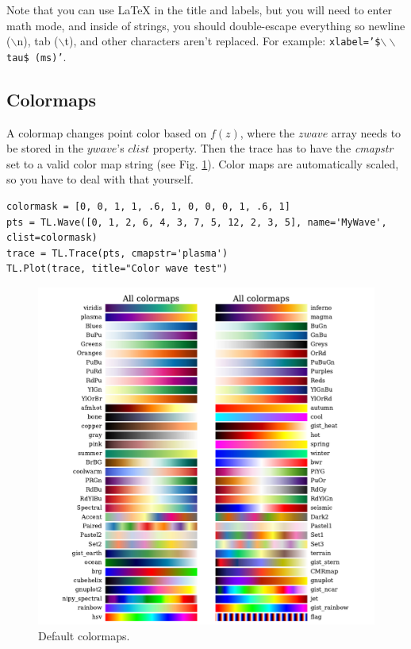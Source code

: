\documentclass[10pt]{report}
\begin{document}
Note that you can use LaTeX in the title and labels, but you will need to enter math mode, and inside of strings, you should double-escape everything so newline ($\backslash$n), tab ($\backslash$t), and other characters aren't replaced. For example: \texttt{xlabel='\$$\backslash\backslash$tau\$ (ms)'}.

\subsection{Colormaps}
A colormap changes point color based on $f(z)$, where the $zwave$ array needs to be stored in the $ywave$'s $clist$ property. Then the trace has to have the \textit{cmapstr} set to a valid color map string (see Fig. \ref{fig:colormaps}). Color maps are automatically scaled, so you have to deal with that yourself.
\begin{lstlisting}[caption=Error Bars on Trace After Creation]
colormask = [0, 0, 1, 1, .6, 1, 0, 0, 0, 1, .6, 1]
pts = TL.Wave([0, 1, 2, 6, 4, 3, 7, 5, 12, 2, 3, 5], name='MyWave', clist=colormask)
trace = TL.Trace(pts, cmapstr='plasma')
TL.Plot(trace, title="Color wave test")
\end{lstlisting}

\begin{figure}[hb]
\vspace{1cm}
\centering
\includegraphics[width=.7\textwidth]{images/colormaps.pdf}
\caption{Default colormaps.}
\label{fig:colormaps}
\end{figure}



\end{document}
